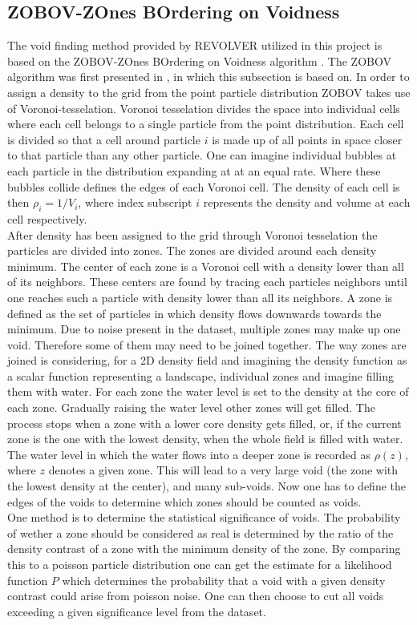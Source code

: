 \subsection{ZOBOV-ZOnes BOrdering on Voidness}
The void finding method provided by REVOLVER utilized in this project is based
on the ZOBOV-ZOnes BOrdering on Voidness algorithm . The ZOBOV algorithm was
first presented in \cite{Neyrinck_2008}, in which this subsection is based on. In
order to assign a density to the grid from the point particle distribution ZOBOV
takes use of Voronoi-tesselation. Voronoi tesselation divides the space into
individual cells where each cell belongs to a single particle from the point
distribution. Each cell is divided so that a cell around particle $i$ is made up of all
points in space closer to that particle than any other particle. One can imagine
individual bubbles at each particle in the distribution expanding at at an equal
rate. Where these bubbles collide defines the edges of each Voronoi cell. The
density of each cell is then $\rho_i=1/V_i$, where index subscript $i$ represents the
density and volume at each cell respectively.\\

After density has been assigned to
the grid through Voronoi tesselation the particles are divided into zones. The
zones are divided around each density minimum. The center of each zone is a
Voronoi cell with a density lower than all of its neighbors. These centers are
found by tracing each particles neighbors until one reaches such a particle with
density lower than all its neighbors. A zone is defined as the set of particles in
which density flows downwards towards the minimum. Due to noise present in the
dataset, multiple zones may make up one void. Therefore some of them may need to
be joined together. The way zones are joined is considering, for a 2D density
field and imagining the density function as a scalar function representing a
landscape, individual zones and imagine filling them with water. For each zone
the water level is set to the density at the core of each zone. Gradually
raising the water level other zones will get filled. The process stops when a
zone with a lower core density gets filled, or, if the current zone is the one
with the lowest density, when the whole field is filled with water. The water
level in which the water flows into a deeper zone is recorded as $\rho(z)$, where $z$ denotes a given zone. This will lead to
a very large void (the zone with the lowest density at the center), and many
sub-voids. Now one has to define the edges of the voids to determine which zones
should be counted as voids.
\\\indent
One method is to determine the statistical significance of voids. The
probability of wether a zone should be considered as real is determined by the
ratio of the density contrast of a zone with the minimum density of the zone. By
comparing this to a poisson particle distribution one can get the estimate for a
likelihood function $P$ which determines the probability that a void with a
given density contrast could arise from poisson noise. One can then choose to
cut all voids exceeding a given significance level from the dataset.
